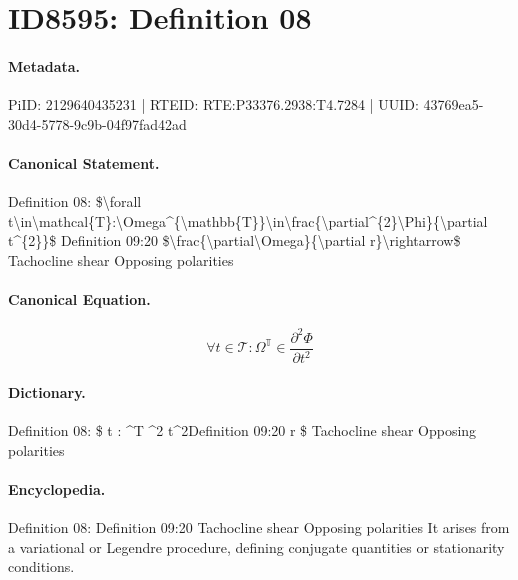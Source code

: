 \section*{ID8595: Definition 08}
\paragraph{Metadata.}
PiID: 2129640435231 | RTEID: RTE:P33376.2938:T4.7284 | UUID: 43769ea5-30d4-5778-9c9b-04f97fad42ad

\paragraph{Canonical Statement.}
Definition 08: \$\textbackslash{}forall t\textbackslash{}in\textbackslash{}mathcal\{T\}:\textbackslash{}Omega\textasciicircum{}\{\textbackslash{}mathbb\{T\}\}\textbackslash{}in\textbackslash{}frac\{\textbackslash{}partial\textasciicircum{}\{2\}\textbackslash{}Phi\}\{\textbackslash{}partial t\textasciicircum{}\{2\}\}\$ Definition 09:20 \$\textbackslash{}frac\{\textbackslash{}partial\textbackslash{}Omega\}\{\textbackslash{}partial r\}\textbackslash{}rightarrow\$ Tachocline shear Opposing polarities

\paragraph{Canonical Equation.}
\[
\forall t\in\mathcal{T}:\Omega^{\mathbb{T}}\in\frac{\partial^{2}\Phi}{\partial t^{2}}
\]

\paragraph{Dictionary.}
Definition 08: \$ t : \textasciicircum{}T \textasciicircum{}2 t\textasciicircum{}2Definition 09:20 r \$ Tachocline shear Opposing polarities

\paragraph{Encyclopedia.}
Definition 08: Definition 09:20 Tachocline shear Opposing polarities It arises from a variational or Legendre procedure, defining conjugate quantities or stationarity conditions.
